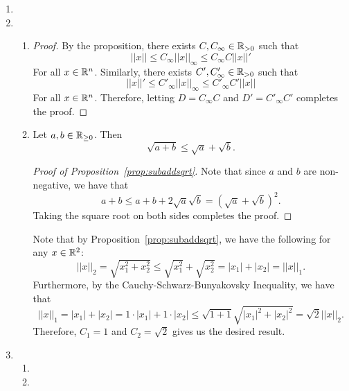 \documentclass[12pt]{article}
\begin{document}
\begin{enumerate}[leftmargin=2em]
    
    \item 


    \item
    \begin{enumerate}[leftmargin=!]
        \item 
        \begin{proof}
            By the proposition, there exists $C, C_{\infty}\in \mathbb{R}_{>0}$ such that
            \[||x||\leq C_{\infty} ||x||_{\infty}\leq C_{\infty} C ||x||'\]
            For all $x\in \mathbb{R}^{n}$. Similarly, there exists $C',C'_{\infty}\in \mathbb{R}_{>0}$ such that 
            \[||x||' \leq C'_{\infty} ||x||_{\infty} \leq C'_{\infty} C' ||x||\]
            For all $x\in \mathbb{R}^n$. Therefore, letting $D=C_{\infty}C$ and $D'=  C'_{\infty} C'$ completes the proof.
        \end{proof}
        \item 
        \begin{proposition}\label{prop:subaddsqrt}
            Let $a,b\in \mathbb{R}_{\geq 0}$. Then
            \[\sqrt{a+b} \leq \sqrt{a}+\sqrt{b}.\]
        \end{proposition}
        \begin{proof}[Proof of Proposition~\ref{prop:subaddsqrt}]
            Note that since $a$ and $b$ are non-negative, we have that
            \[a+b \leq a+b+2\sqrt{a}\sqrt{b} = {(\sqrt{a}+\sqrt{b})}^2.\]
            Taking the square root on both sides completes the proof.
        \end{proof}

        Note that by Proposition~\ref{prop:subaddsqrt}, we have the following for any $x\in \mathbb{R}^2$:
        \[||x||_{2}=\sqrt{x_1^2+x_2^2} \leq \sqrt{x_1^2}+\sqrt{x_2^2} = |x_1|+|x_2| = ||x||_{1}.\]
        Furthermore, by the Cauchy-Schwarz-Bunyakovsky Inequality, we have that
        \[||x||_{1} = |x_1|+|x_2| = 1\cdot |x_1|+1\cdot|x_2| \leq \sqrt{1+1}\sqrt{|x_1|^2+|x_2|^2} = \sqrt{2}||x||_{2}.\]
        Therefore, $C_1=1$ and $C_2 = \sqrt{2}$ gives us the desired result.
    \end{enumerate}

    \item
    \begin{enumerate}[leftmargin=!]
        \item 

        \item
    \end{enumerate}
    
\end{enumerate}
\end{document}
